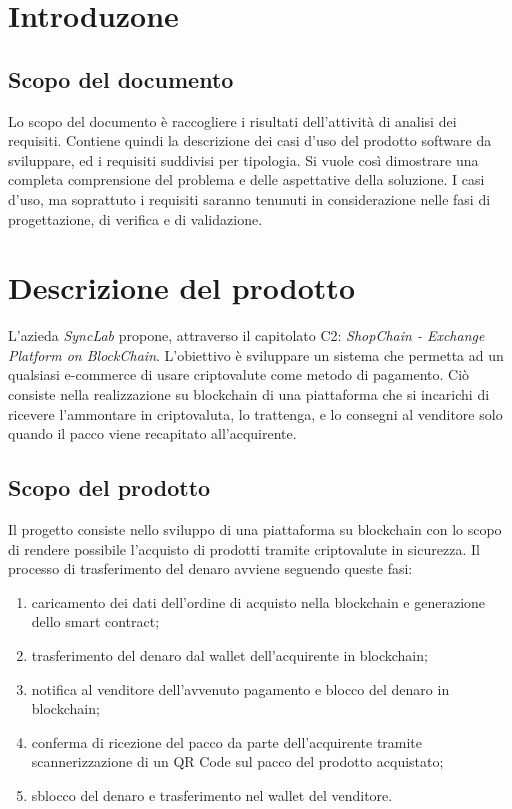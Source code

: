 \documentclass[a4paper, 12pt]{article}
\begin{document}
\makefrontpage

\makeversioni

\section{Introduzone}
\subsection{Scopo del documento}
Lo scopo del documento è raccogliere i risultati dell'attività di analisi dei requisiti. Contiene quindi la descrizione dei casi d'uso del prodotto software da sviluppare, ed i requisiti suddivisi per tipologia. Si vuole così dimostrare una completa comprensione del problema e delle aspettative della soluzione. I casi d'uso, ma soprattuto i requisiti saranno tenunuti in considerazione nelle fasi di progettazione, di verifica e di validazione. 

\section{Descrizione del prodotto}
L'azieda \textit{SyncLab} propone, attraverso il capitolato C2: \textit{ShopChain - Exchange Platform on
BlockChain}. L'obiettivo è sviluppare un sistema che permetta ad un qualsiasi e-commerce di usare criptovalute come metodo di pagamento. Ciò consiste nella realizzazione su blockchain di una piattaforma che si incarichi di ricevere l’ammontare in criptovaluta, lo trattenga, e lo consegni al venditore solo quando il pacco viene recapitato all’acquirente.
\subsection{Scopo del prodotto}
Il progetto consiste nello sviluppo di una piattaforma su blockchain con lo scopo di rendere possibile l'acquisto di prodotti tramite criptovalute in sicurezza. Il processo di trasferimento del denaro avviene seguendo queste fasi:
\begin{enumerate}
\item caricamento dei dati dell'ordine di acquisto nella blockchain e generazione dello smart contract;
\item trasferimento del denaro dal wallet dell'acquirente in blockchain;
\item notifica al venditore dell'avvenuto pagamento e blocco del denaro in blockchain;
\item conferma di ricezione del pacco da parte dell'acquirente tramite scannerizzazione di un QR Code sul pacco del prodotto acquistato;
\item sblocco del denaro e trasferimento nel wallet del venditore.
\end{enumerate}
\end{document}
